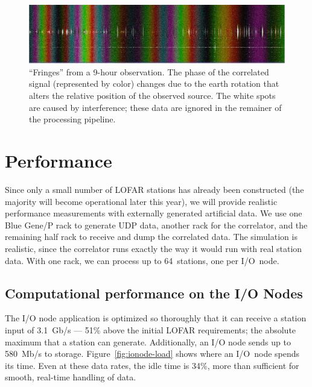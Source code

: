 \documentclass[conference]{IEEEtran}
\begin{document}
\begin{figure}
\includegraphics[width=\columnwidth]{fringe.jpg}
\caption{``Fringes'' from a 9-hour observation.  The phase of the correlated
signal (represented by color) changes due to the earth rotation that alters
the relative position of the observed source.
The white spots are caused by interference; these data are ignored in the
remainer of the processing pipeline.}
\label{fig:fringe}
\end{figure}


\section{Performance}

Since only a small number of LOFAR stations has already been constructed
(the majority will become operational later this year), we will provide 
realistic performance measurements with externally generated artificial data.
We use one Blue Gene/P rack to generate UDP data, another rack for the correlator, and
the remaining half rack to receive and dump the correlated data.
The simulation is realistic, since the correlator runs exactly
the way it would run with real station data.
With one rack, we can process up to 64~stations, one per I/O~node.



\subsection{Computational performance on the I/O Nodes}


The I/O node application is optimized so thoroughly that it can receive a
station input of 3.1~Gb/s --- 51\% above the initial LOFAR requirements; the
absolute maximum that a station can generate.
Additionally, an I/O node sends up to 580~Mb/s to storage.
Figure~\ref{fig:ionode-load} shows where an I/O~node spends its time.
Even at these data rates, the idle time is 34\%, more than sufficient for
smooth, real-time handling of data.
\end{document}

